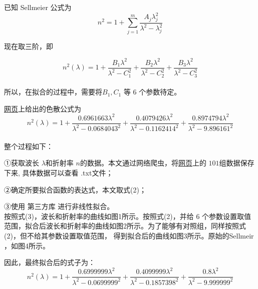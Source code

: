 \documentclass[12pt, a4paper, oneside, UTF8]{ctexart}
\begin{document}
已知 Sellmeier 公式为
\begin{equation}
n^{2} = 1 + \sum_{j=1}^{m}\frac{A_{j}\lambda _{j}^{2}}{\lambda^{2}-\lambda _{j}^{2} }
\end{equation}

现在取三阶，即

\begin{equation}
    n^{2}(\lambda) = 1 + \frac{B_1 \lambda^2}{\lambda^2 - C_1^2} + \frac{B_2 \lambda^2}{\lambda^2 - C_2^2}
+ \frac{B_3 \lambda^2}{\lambda^2 - C_3^2}
\end{equation}\\
所以，在拟合的过程中，需要将$B_1,C_1$ 等 6 个参数待定。

\href{https://refractiveindex.info/?shelf=main&book=SiO2&page=Malitson}{网页}上给出的色散公式为
\begin{equation}
    n^{2}(\lambda) = 1 + \frac{0.6961663 \lambda^2}{\lambda^2 - 0.0684043^2} + \frac{0.4079426 \lambda^2}{\lambda^2 - 0.1162414^2}
+ \frac{0.8974794 \lambda^2}{\lambda^2 - 9.896161^2}
\end{equation}
\\

整个过程如下：

①获取波长 \@$\lambda$\@ 和折射率 \@$n$\@ 的数据。本文通过网络爬虫，将\href{https://refractiveindex.info/?shelf=main&book=SiO2&page=Malitson}{网页}上的 \@$101$\@ 组数据保存下来,
具体数据可以查看 \@data.txt\@ 文件；

②确定所要拟合函数的表达式，本文取式(2)；

③使用 \@python\@ 第三方库 \@scipy\@ 进行非线性拟合。
\\

按照式(3)，波长和折射率的曲线如图\@ 1所示。按照式(2)，并给 6 个参数设置取值范围，拟合后波长和折射率的曲线如图\@ 2所示。为了能够有对照组，同样按照式(2)，但不给其参数设置取值范围，
得到拟合后的曲线如图\@ 3所示。原始的\@ Sellmeir ，如图\@ 4所示。

因此，最终拟合后的式子为：
\begin{equation}
    n^{2}(\lambda) = 1 + \frac{0.6999999 \lambda^2}{\lambda^2 - 0.0699999^2} + \frac{0.4099999 \lambda^2}{\lambda^2 - 0.1857398^2}
+ \frac{0.8 \lambda^2}{\lambda^2 - 9.999999^2}
\end{equation}\\
\end{document}
